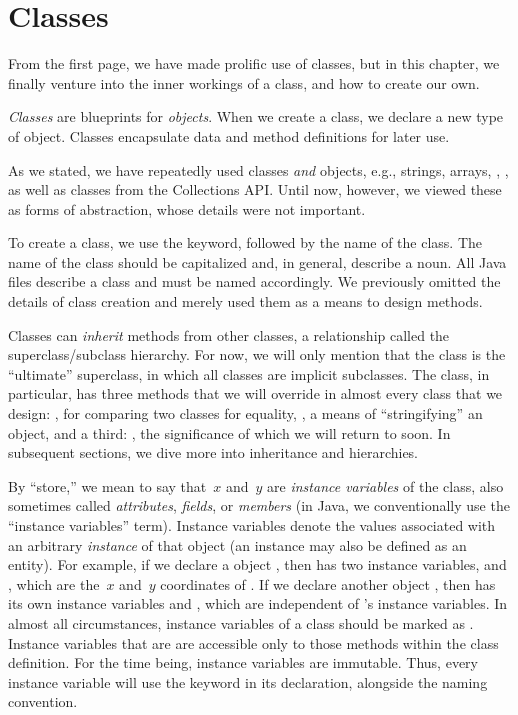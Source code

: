 \section{Classes}
\label{chapter-classes-classes}

From the first page, we have made prolific use of classes, but in this chapter, we finally venture into the inner workings of a class, and how to create our own.

\emph{Classes} are blueprints for \emph{objects}. 
When we create a class, we declare a new type of object. 
Classes encapsulate data and method definitions for later use.

As we stated, we have repeatedly used classes \emph{and} objects, e.g., strings, arrays, , , as well as classes from the Collections API. 
Until now, however, we viewed these as forms of abstraction, whose details were not important. 

To create a class, we use the  keyword, followed by the name of the class. 
The name of the class should be capitalized and, in general, describe a noun. 
All Java files describe a class and must be named accordingly. 
We previously omitted the details of class creation and merely used them as a means to design methods.

Classes can \emph{inherit} methods from other classes, a relationship called the superclass/subclass hierarchy. 
For now, we will only mention that the  class is the ``ultimate'' superclass, in which all classes are implicit subclasses. 
The  class, in particular, has three methods that we will override in almost every class that we design: , for comparing two classes for equality, , a means of ``stringifying'' an object, and a third: , the significance of which we will return to soon. 
In subsequent sections, we dive more into inheritance and hierarchies.

By ``store,'' we mean to say that~$x$ and~$y$ are \emph{instance variables} of the  class, also sometimes called \emph{attributes}, \emph{fields}, or \emph{members} (in Java, we conventionally use the ``instance variables'' term). 
Instance variables denote the values associated with an arbitrary \emph{instance} of that object (an instance may also be defined as an entity). 
For example, if we declare a  object , then  has two instance variables,  and , which are the~$x$ and~$y$ coordinates of .
If we declare another  object , then  has its own instance variables  and , which are independent of 's instance variables. 
In almost all circumstances, instance variables of a class should be marked as . 
Instance variables that are  are accessible only to those methods within the class definition. 
For the time being, instance variables are immutable. 
Thus, every instance variable will use the  keyword in its declaration, alongside the  naming convention.

